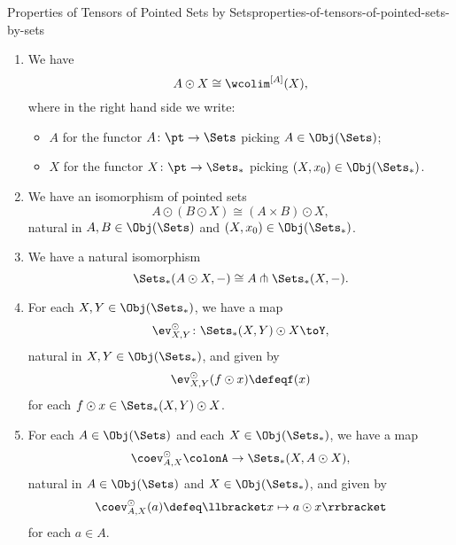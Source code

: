 \begin{proposition}{Properties of Tensors of Pointed Sets by Sets}{properties-of-tensors-of-pointed-sets-by-sets}
\begin{enumerate}
            natural in $A\in\Obj(\Sets)$ and $X,Y\in\Obj(\Sets_{*})$.
        \item\label{properties-of-tensors-of-pointed-sets-by-sets-as-a-weighted-colimit}We have
            \[
                A\odot X%
                \cong%
                \wcolim^{[A]}(X),
            \]%
            where in the right hand side we write:
            \begin{itemize}
                \item $A$ for the functor $A\colon\pt\to\Sets$ picking $A\in\Obj(\Sets)$;
                \item $X$ for the functor $X\colon\pt\to\Sets_{*}$ picking $(X,x_{0})\in\Obj(\Sets_{*})$.
            \end{itemize}
        \item\label{properties-of-tensors-of-pointed-sets-by-sets-iterated-tensors}We have an isomorphism of pointed sets
            \[
                A\odot(B\odot X)%
                \cong%
                (A\times B)\odot X,%
            \]%
            natural in $A,B\in\Obj(\Sets)$ and $(X,x_{0})\in\Obj(\Sets_{*})$.
        \item\label{properties-of-tensors-of-pointed-sets-by-sets-interaction-with-homs}We have a natural isomorphism
            \[%
                \Sets_{*}(A\odot X,-)%
                \cong %
                A\pitchfork\Sets_{*}(X,-).%
            \]%
        \item\label{properties-of-tensors-of-pointed-sets-by-sets-the-tensor-evaluation-map}For each $X,Y\in\Obj(\Sets_{*})$, we have a map
            \[
                \ev^{\odot}_{X,Y}%
                \colon%
                \Sets_{*}(X,Y)\odot X%
                \to%
                Y,%
            \]%
            natural in $X,Y\in\Obj(\Sets_{*})$, and given by
            \[%
                \ev^{\odot}_{X,Y}(f\odot x)%
                \defeq%
                f(x)%
            \]%
            for each $f\odot x\in\Sets_{*}(X,Y)\odot X$.%
        \item\label{properties-of-tensors-of-pointed-sets-by-sets-the-tensor-coevaluation-map}For each $A\in\Obj(\Sets)$ and each $X\in\Obj(\Sets_{*})$, we have a map
            \[
                \coev^{\odot}_{A,X}%
                \colon%
                A%
                \to%
                \Sets_{*}(X,A\odot X),%
            \]%
            natural in $A\in\Obj(\Sets)$ and $X\in\Obj(\Sets_{*})$, and given by
            \[%
                \coev^{\odot}_{A,X}(a)%
                \defeq%
                \llbracket x\mapsto a\odot x\rrbracket%
            \]%
            for each $a\in A$.%
    \end{enumerate}
\end{proposition}

